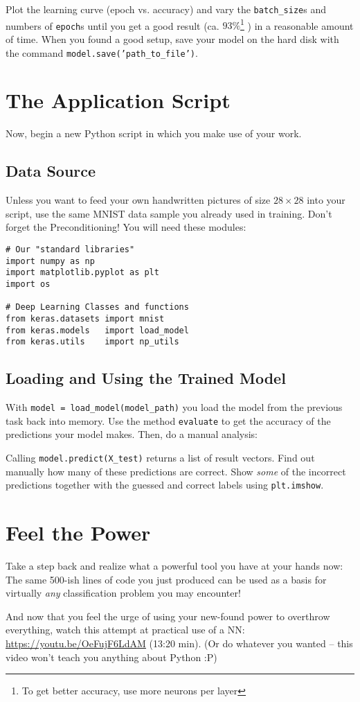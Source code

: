 \documentclass[
	english,
	fontsize=10pt,
	parskip=half,
	titlepage=true,
	DIV=12
]{scrartcl}
\newcommand*{\inPy}[1]{\texttt{#1}}
\begin{document}
Plot the learning curve (epoch vs. accuracy) and vary the \texttt{batch\_size}s and numbers of \texttt{epoch}s until you get a good result (ca. $93\%$\footnote{
	To get better accuracy, use more neurons per layer
}
) in a reasonable amount of time. When you found a good setup, save your model on the hard disk with the command \inPy{model.save('path_to_file')}.

\section{The Application Script}
Now, begin a new Python script in which you make use of your work.

\subsection{Data Source}
Unless you want to feed your own handwritten pictures of size $28 \times 28$ into your script, use the same MNIST data sample you already used in training. Don't forget the Preconditioning! You will need these modules:
\begin{verbatim}
# Our "standard libraries"
import numpy as np
import matplotlib.pyplot as plt
import os

# Deep Learning Classes and functions
from keras.datasets import mnist
from keras.models   import load_model
from keras.utils    import np_utils
\end{verbatim}

\subsection{Loading and Using the Trained Model}
With \texttt{model = load\_model(model\_path)} you load the model from the previous task back into memory. Use the method \texttt{evaluate} to get the accuracy of the predictions your model makes. Then, do a manual analysis:

Calling \texttt{model.predict(X\_test)} returns a list of result vectors. Find out manually how many of these predictions are correct. Show \emph{some} of the incorrect predictions together with the guessed and correct labels using \texttt{plt.imshow}.

\section{Feel the Power}
Take a step back and realize what a powerful tool you have at your hands now: The same 500-ish lines of code you just produced can be used as a basis for virtually \emph{any} classification problem you may encounter!

And now that you feel the urge of using your new-found power to overthrow everything, watch this attempt at practical use of a NN:
\url{https://youtu.be/OeFujF6LdAM} (13:20 min). (Or do whatever you wanted -- this video won't teach you anything about Python :P)
\end{document}
